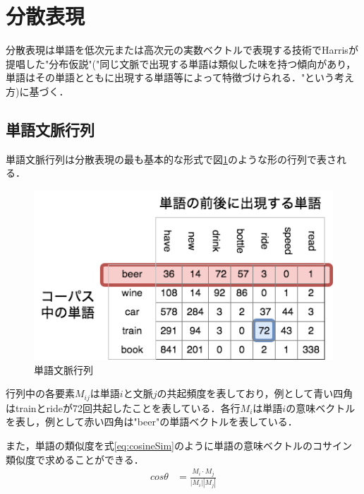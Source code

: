 \section{分散表現}
\label{rel:part:vec}
分散表現は単語を低次元または高次元の実数ベクトルで表現する技術でHarris\cite{firth1957hypothesis}が提唱した"分布仮説"("同じ文脈で出現する単語は類似した味を持つ傾向があり，単語はその単語とともに出現する単語等によって特徴づけられる．"という考え方)に基づく．
\subsection{単語文脈行列}
\label{rel:wordEmbed:WordParagraphMat}
単語文脈行列は分散表現の最も基本的な形式で図\ref{Fig:WordParagraphMat}のような形の行列で表される．
\begin{figure}[htbp]
 \begin{center}
  \includegraphics[width=\textwidth]{../images/2.Related_Work/WordParagraphMatrix2.png}
  \caption{単語文脈行列}
  \label{Fig:WordParagraphMat}
  \vspace{-10pt}
 \end{center}
\end{figure}

行列中の各要素$M_{ij}$は単語$i$と文脈$j$の共起頻度を表しており，例として青い四角はtrainとrideが72回共起したことを表している．各行$M_i$は単語$i$の意味ベクトルを表し，例として赤い四角は"beer"の単語ベクトルを表している．

また，単語の類似度を式\ref{eq:cosineSim}のように単語の意味ベクトルのコサイン類似度で求めることができる．
\begin{equation}
\begin{aligned}
\label{eq:cosineSim}
cos \theta & = \frac{M_i \cdot M_j}{ | M_i | | M_j |}
\end{aligned}
\end{equation}


